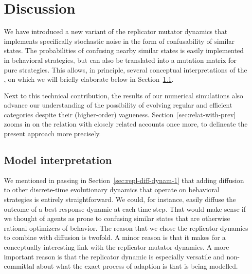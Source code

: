 \section{Discussion}
\label{sec:discussion}

We have introduced a new variant of the replicator mutator dynamics
that implements specifically stochastic noise in the form of
confusability of similar states. The probabilities of confusing nearby
similar states is easily implemented in behavioral strategies, but can
also be translated into a mutation matrix for pure strategies. This
allows, in principle, several conceptual interpretations of the \rdd,
on which we will briefly elaborate below in
Section~\ref{sec:model-interpretation}.

Next to this technical contribution, the results of our numerical
simulations also advance our understanding of the possibility of
evolving regular and efficient categories despite their (higher-order)
vagueness. Section~\ref{sec:relat-with-prev} zooms in on the relation
with closely related accounts once more, to delineate the present
approach more precisely.

\subsection{Model interpretation}
\label{sec:model-interpretation}

We mentioned in passing in Section~\ref{sec:repl-diff-dynam-1} that
adding diffusion to other discrete-time evolutionary dynamics that
operate on behavioral strategies is entirely straightforward. We
could, for instance, easily diffuse the outcome of a best-response
dynamic at each time step. That would make sense if we thought of
agents as prone to confusing similar states that are otherwise
rational optimizers of behavior. The reason that we chose the
replicator dynamics to combine with diffusion is twofold. A minor
reason is that it makes for a conceptually interesting link with the
replicator mutator dynamics. A more important reason is that the
replicator dynamic is especially versatile and non-committal about
what the exact process of adaption is that is being modelled.

